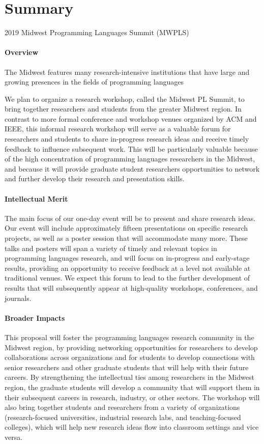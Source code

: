 \documentclass[11pt]{article}
\newcommand{\parahead}[1]{\paragraph{#1}}
\begin{document}
\section*{Summary} 

{\Large 2019 Midwest Programming Languages Summit (MWPLS)}

\parahead{Overview}

The Midwest features many research-intensive institutions that have large and growing presences in the fields of programming languages

We plan to organize a research workshop, called the Midwest PL Summit,
to bring together researchers and students from the greater Midwest
region. In contrast to more formal conference and workshop venues
organized by ACM and IEEE, this informal research workshop will serve
as a valuable forum for researchers and students to share in-progress
research ideas and receive timely feedback to influence subsequent
work.
This will be particularly valuable
because of the high concentration of programming languages researchers
in the Midwest, and because it will provide graduate student
researchers opportunities to network and further develop their
research and presentation skills.

\vspace{8pt}

\parahead{Intellectual Merit}

The main focus of our one-day event will be to present and share
research ideas. Our event will include approximately fifteen
presentations on specific research projects, as well as a poster
session that will accommodate many more. These talks and posters will
span a variety of timely and relevant topics in programming languages
research, and will focus on in-progress and early-stage results, providing an opportunity to receive feedback at a level not available at traditional venues. We expect this forum to lead to the further development of results that will subsequently appear at high-quality workshops, conferences, and journals.

\vspace{8pt}

\parahead{Broader Impacts}

This proposal will foster the programming languages research community in
the Midwest region, by providing networking opportunities for
researchers to develop collaborations across organizations and for
students to develop connections with senior researchers and other
graduate students that will help with their future careers.
By strengthening
the intellectual ties among researchers in the Midwest region, the
graduate students will develop a community that will support them in
their subsequent careers in research, industry, or other sectors. The
workshop will also bring together students and researchers from a
variety of organizations (research-focused universities, industrial
research labs, and teaching-focused colleges), which will help new
research ideas flow into classroom settings and vice versa.
\end{document}
